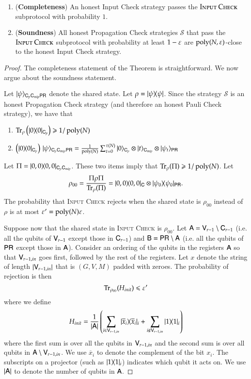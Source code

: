 \begin{lemma}	
\label{lem:input_check}
\begin{enumerate}
	\item (\textbf{Completeness}) An honest Input Check strategy passes the $\textsc{Input Check}$ subprotocol with probability $1$. 
	\item (\textbf{Soundness}) All honest Propagation Check strategies $\mathcal{S}$ that pass the $\textsc{Input Check}$ subprotocol with probability at least $1 - \varepsilon$ are $\operatorname{poly}(N,\varepsilon)$-close to the honest Input Check strategy.
\end{enumerate}
\end{lemma}
\begin{proof}
The completeness statement of the Theorem is straightforward. We now argue about the soundness statement.

Let $|\psi\rangle_{{\mathsf{C}}_p {\mathsf{C}}_{mip} {\mathsf{P}} {\mathsf{R}}}$ denote the shared state. Let $\rho = |\psi\rangle\! \langle \psi|$. Since the strategy $\mathcal{S}$ is an honest Propagation Check strategy (and therefore an honest Pauli Check strategy), we have that
\begin{enumerate}
	\item $\operatorname{Tr}_\rho \left ( |0\rangle\! \langle 0|_{{\mathsf{C}}_p} \right) \geqslant 1/\operatorname{poly}(N)$
	\item $	\left( |0\rangle\! \langle 0|_{{\mathsf{C}}_p} \right) \, |\psi\rangle_{{\mathsf{C}}_p {\mathsf{C}}_{mip} {\mathsf{P}} {\mathsf{R}}} = \frac{1}{\operatorname{poly}(N)} \sum_{t = 0}^{\tau(N)} |0\rangle_{{\mathsf{C}}_p} \otimes |t\rangle_{{\mathsf{C}}_{mip}} \otimes |\psi_t\rangle_{{\mathsf{P}} {\mathsf{R}}}$
\end{enumerate}
Let $\Pi = |0,0\rangle\! \langle 0,0|_{{\mathsf{C}}_p {\mathsf{C}}_{mip}}$. These two items imply that $\operatorname{Tr}_\rho (\Pi) \geqslant 1/\operatorname{poly}(N)$. Let 
\[
	\rho_{00} = \frac{\Pi \rho \Pi}{\operatorname{Tr}_\rho (\Pi)} = |0,0\rangle\! \langle 0,0|_{{\mathsf{C}}} \otimes |\psi_0\rangle\! \langle \psi_0|_{{\mathsf{P}} {\mathsf{R}}}.
\]
The probability that \textsc{Input Check} rejects when the shared state is $\rho_{00}$ instead of $\rho$ is at most $\varepsilon' = \operatorname{poly}(N) \varepsilon$. 

Suppose now that the shared state in \textsc{Input Check} is $\rho_{00}$. Let ${\mathsf{A}} = {\mathsf{V}}_{r-1} \setminus {\mathsf{C}}_{r-1}$ (i.e. all the qubits of ${\mathsf{V}}_{r-1}$ except those in ${\mathsf{C}}_{r-1}$) and ${\mathsf{B}} = {\mathsf{P}} {\mathsf{R}} \setminus {\mathsf{A}}$ (i.e. all the qubits of ${\mathsf{P}} {\mathsf{R}}$ except those in ${\mathsf{A}}$). Consider an ordering of the qubits in the registers ${\mathsf{A}}$  so that ${\mathsf{V}}_{r-1,in}$ goes first, followed by the rest of the registers. Let $x$ denote the string of length $|{\mathsf{V}}_{r-1,in}|$ that is $(G,V,M)$ padded with zeroes. The probability of rejection is then
	\begin{equation}
		\Tr_{\rho_{00}} ( H_{init} ) \leq \eps'
		\label{eq:init}
	\end{equation}
	where we define 
	\[
		H_{init} = \frac{1}{\left | {\mathsf{A}} \right|} \left ( \sum_{i \in {\mathsf{V}}_{r-1,in}} |\overline{x}_i\rangle\! \langle \overline{x}_i|_i +  \sum_{i \notin {\mathsf{V}}_{r-1,in}} |1\rangle\! \langle 1|_i \right)
	\] 
	where the first sum is over all the qubits in ${\mathsf{V}}_{r-1,in}$ and the second sum is over all qubits in ${\mathsf{A}} \setminus {\mathsf{V}}_{r-1,in}$. We use $\overline{x}_i$ to denote the complement of the bit $x_i$. The subscripts on a projector (such as $|1\rangle\! \langle 1|_i$) indicates which qubit it acts on. We use $|{\mathsf{A}}|$ to denote the number of qubits in ${\mathsf{A}}$. 
	

\end{proof}
